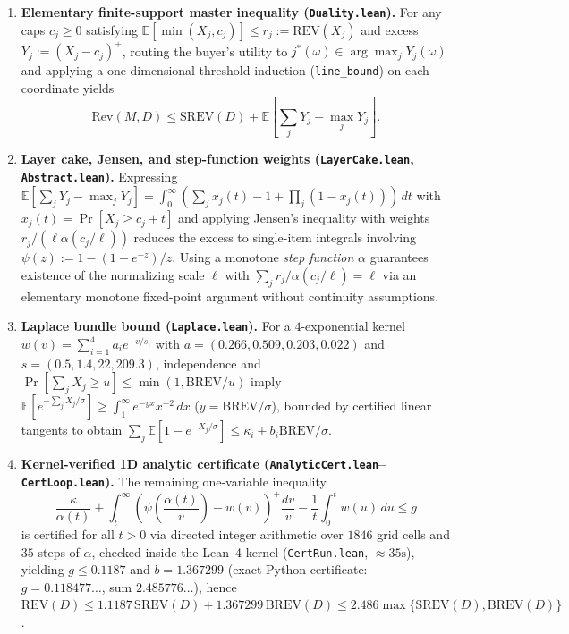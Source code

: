 \documentclass[11pt]{article}
\newcommand{\REV}{\mathrm{REV}}
\newcommand{\SREV}{\mathrm{SREV}}
\newcommand{\BREV}{\mathrm{BREV}}
\newcommand{\E}{\mathbb{E}}
\begin{document}
\begin{enumerate}
  \item \textbf{Elementary finite-support master inequality (\texttt{Duality.lean}).} For any caps $c_j \ge 0$ satisfying $\E[\min(X_j, c_j)] \le r_j := \REV(X_j)$ and excess $Y_j := (X_j - c_j)^+$, routing the buyer's utility to $j^*(\omega) \in \arg\max_j Y_j(\omega)$ and applying a one-dimensional threshold induction (\texttt{line\_bound}) on each coordinate yields
  \[
    \mathrm{Rev}(M, D) \le \SREV(D) + \E\!\left[\sum_j Y_j - \max_j Y_j\right].
  \]
  \item \textbf{Layer cake, Jensen, and step-function weights (\texttt{LayerCake.lean}, \texttt{Abstract.lean}).} Expressing $\E[\sum_j Y_j - \max_j Y_j] = \int_0^\infty (\sum_j x_j(t) - 1 + \prod_j (1 - x_j(t)))\,dt$ with $x_j(t) = \Pr[X_j \ge c_j + t]$ and applying Jensen's inequality with weights $r_j / (\ell \alpha(c_j/\ell))$ reduces the excess to single-item integrals involving $\psi(z) := 1 - (1 - e^{-z})/z$. Using a monotone \emph{step function} $\alpha$ guarantees existence of the normalizing scale $\ell$ with $\sum_j r_j/\alpha(c_j/\ell) = \ell$ via an elementary monotone fixed-point argument without continuity assumptions.
  \item \textbf{Laplace bundle bound (\texttt{Laplace.lean}).} For a $4$-exponential kernel $w(v) = \sum_{i=1}^4 a_i e^{-v/s_i}$ with $a = (0.266, 0.509, 0.203, 0.022)$ and $s = (0.5, 1.4, 22, 209.3)$, independence and $\Pr[\sum_j X_j \ge u] \le \min(1, \BREV/u)$ imply $\E[e^{-\sum_j X_j/\sigma}] \ge \int_1^\infty e^{-yx} x^{-2}\,dx$ ($y = \BREV/\sigma$), bounded by certified linear tangents to obtain $\sum_j \E[1 - e^{-X_j/\sigma}] \le \kappa_i + b_i \BREV/\sigma$.
  \item \textbf{Kernel-verified 1D analytic certificate (\texttt{AnalyticCert.lean}--\texttt{CertLoop.lean}).} The remaining one-variable inequality
  \[
    \frac{\kappa}{\alpha(t)} + \int_t^\infty \left(\psi\!\left(\frac{\alpha(t)}{v}\right) - w(v)\right)^+ \frac{dv}{v} - \frac{1}{t}\int_0^t w(u)\,du \le g
  \]
  is certified for all $t > 0$ via directed integer arithmetic over $1846$ grid cells and $35$ steps of $\alpha$, checked inside the Lean~4 kernel (\texttt{CertRun.lean}, $\approx 35\text{s}$), yielding $g \le 0.1187$ and $b = 1.367299$ (exact Python certificate: $g = 0.118477\ldots$, sum $2.485776\ldots$), hence $\REV(D) \le 1.1187\,\SREV(D) + 1.367299\,\BREV(D) \le 2.486 \max\{\SREV(D), \BREV(D)\}$.
\end{enumerate}
\end{document}
